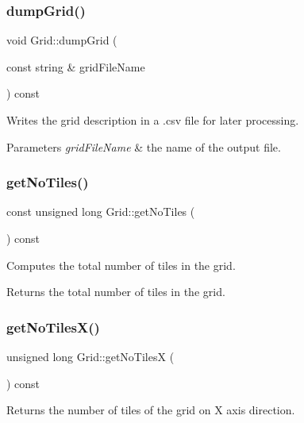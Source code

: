 \mbox{\label{class_grid_a0024d8d3cdd7b95f9fd61205ce8b9dea}} 
\subsubsection{\texorpdfstring{dumpGrid()}{dumpGrid()}}
{\footnotesize\ttfamily void Grid\+::dump\+Grid (\begin{DoxyParamCaption}\item[{const string \&}]{grid\+File\+Name }\end{DoxyParamCaption}) const}

Writes the grid description in a .csv file for later processing. 
\begin{DoxyParams}{Parameters}
{\em grid\+File\+Name} & the name of the output file. \\
\hline
\end{DoxyParams}
\mbox{\label{class_grid_ab0a71c762b6c33e6fa2fd49dde38228b}} 
\subsubsection{\texorpdfstring{getNoTiles()}{getNoTiles()}}
{\footnotesize\ttfamily const unsigned long Grid\+::get\+No\+Tiles (\begin{DoxyParamCaption}{ }\end{DoxyParamCaption}) const}

Computes the total number of tiles in the grid. \begin{DoxyReturn}{Returns}
the total number of tiles in the grid. 
\end{DoxyReturn}
\mbox{\label{class_grid_af29c0c404a908aa46f83afb17d7609a6}} 
\subsubsection{\texorpdfstring{getNoTilesX()}{getNoTilesX()}}
{\footnotesize\ttfamily unsigned long Grid\+::get\+No\+TilesX (\begin{DoxyParamCaption}{ }\end{DoxyParamCaption}) const}

\begin{DoxyReturn}{Returns}
the number of tiles of the grid on X axis direction. 
\end{DoxyReturn}
\mbox{\label{class_grid_a783a3153d03154cfd33e6a418bb8d390}} 
